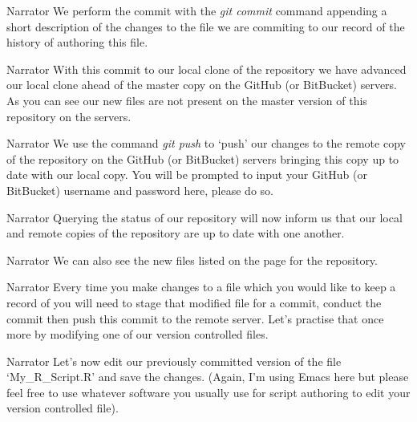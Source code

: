 \documentclass{screenplay} %
\begin{document}
\begin{dialogue}{Narrator}
We perform the commit with the \textit{git commit} command appending a short description of the changes to the file we are commiting to our record of the history of authoring this file.
\end{dialogue}

\begin{dialogue}{Narrator}
With this commit to our local clone of the repository we have advanced our local clone ahead of the master copy on the GitHub (or BitBucket) servers. As you can see our new files are not present on the master version of this repository on the servers.
\end{dialogue}

\begin{dialogue}{Narrator}
We use the command \textit{git push} to `push' our changes to the remote copy of the repository on the GitHub (or BitBucket) servers bringing this copy up to date with our local copy.  You will be prompted to input your GitHub (or BitBucket) username and password here, please do so.
\end{dialogue}

\begin{dialogue}{Narrator}
Querying the status of our repository will now inform us that our local and remote copies of the repository are up to date with one another.
\end{dialogue}

\begin{dialogue}{Narrator}
We can also see the new files listed on the page for the repository.
\end{dialogue}

\begin{dialogue}[]{Narrator}
Every time you make changes to a file which you would like to keep a record of you will need to stage that modified file for a commit, conduct the commit then push this commit to the remote server.  Let's practise that once more by modifying one of our version controlled files.
\end{dialogue}

\begin{dialogue}{Narrator}
Let's now edit our previously committed version of the file `My\_R\_Script.R' and save the changes. (Again, I'm using Emacs here but please feel free to use whatever software you usually use for script authoring to edit your version controlled file).
\end{dialogue}
\end{document}
